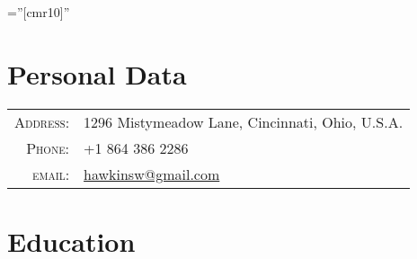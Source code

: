 \documentclass[a4paper,10pt]{article} %
\begin{document}
\pagestyle{empty} %

\font\fb=''[cmr10]'' %


\par{\bigskip\par} %

\section{Personal Data}

\begin{tabular}{rl}
\textsc{Address:} & 1296 Mistymeadow Lane, Cincinnati, Ohio, U.S.A.\\
\textsc{Phone:} & +1 864 386 2286\\
\textsc{email:} & \href{mailto:hawkinsw@gmail.com}{hawkinsw@gmail.com}
\end{tabular}


\section{Education}
\end{document}
